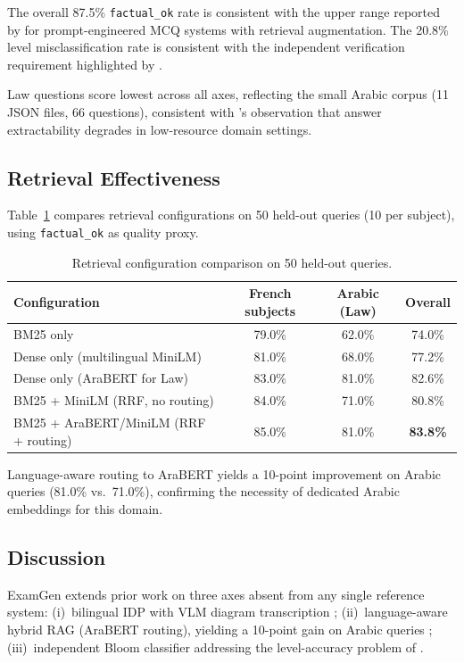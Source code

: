 The overall 87.5\% \texttt{factual\_ok} rate is consistent with the upper range
reported by \citet{mucciaccia2025mcq} for prompt-engineered MCQ systems with
retrieval augmentation. The 20.8\% level misclassification rate is consistent with
the independent verification requirement highlighted by \citet{meissner2024itemforge}.

Law questions score lowest across all axes, reflecting the small Arabic corpus
(11 JSON files, 66 questions), consistent with \citet{morris2024aqg}'s observation
that answer extractability degrades in low-resource domain settings.

\subsection{Retrieval Effectiveness}

Table~\ref{tab:rag} compares retrieval configurations on 50 held-out queries
(10 per subject), using \texttt{factual\_ok} as quality proxy.

\begin{table}[H]
\centering
\caption{Retrieval configuration comparison on 50 held-out queries.}
\label{tab:rag}
\begin{tabular}{lccc}
\toprule
\textbf{Configuration} & \textbf{French subjects} & \textbf{Arabic (Law)}
  & \textbf{Overall} \\
\midrule
BM25 only                           & 79.0\% & 62.0\% & 74.0\% \\
Dense only (multilingual MiniLM)    & 81.0\% & 68.0\% & 77.2\% \\
Dense only (AraBERT for Law)        & 83.0\% & 81.0\% & 82.6\% \\
BM25 + MiniLM (RRF, no routing)    & 84.0\% & 71.0\% & 80.8\% \\
BM25 + AraBERT/MiniLM (RRF + routing) & 85.0\% & 81.0\% & \textbf{83.8\%} \\
\bottomrule
\end{tabular}
\end{table}

Language-aware routing to AraBERT yields a 10-point improvement on Arabic queries
(81.0\% vs.\ 71.0\%), confirming the necessity of dedicated Arabic embeddings for
this domain.

\subsection{Discussion}

ExamGen extends prior work on three axes absent from any single reference system:
(i)~bilingual IDP with VLM diagram transcription \cite{mucciaccia2025mcq};
(ii)~language-aware hybrid RAG (AraBERT routing), yielding a 10-point gain on
Arabic queries \cite{isley2025quality,morris2024aqg};
(iii)~independent Bloom classifier addressing the level-accuracy problem
of \citet{meissner2024itemforge}.


